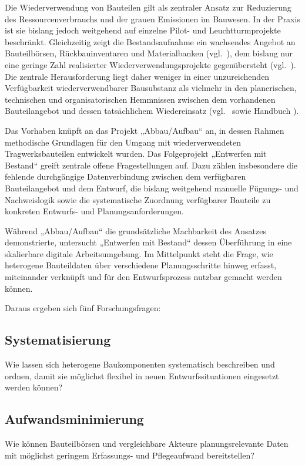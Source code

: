 \documentclass[type=zwischenbericht,theme=dark]{zukunftbau}
\begin{document}
Die Wiederverwendung von Bauteilen gilt als zentraler Ansatz zur Reduzierung des Ressourcenverbrauchs und der grauen Emissionen im Bauwesen. In der Praxis ist sie bislang jedoch weitgehend auf einzelne Pilot- und Leuchtturmprojekte beschränkt. Gleichzeitig zeigt die Bestandsaufnahme ein wachsendes Angebot an Bauteilbörsen, Rückbauinventaren und Materialbanken (vgl.\ ), dem bislang nur eine geringe Zahl realisierter Wiederverwendungsprojekte gegenübersteht (vgl.\ ). Die zentrale Herausforderung liegt daher weniger in einer unzureichenden Verfügbarkeit wiederverwendbarer Bausubstanz als vielmehr in den planerischen, technischen und organisatorischen Hemmnissen zwischen dem vorhandenen Bauteilangebot und dessen tatsächlichem Wiedereinsatz (vgl.\  sowie Handbuch \cite{udk-abbau-aufbau-handbuch-2023}).

Das Vorhaben knüpft an das Projekt „Abbau/Aufbau“ \cite{bbsr-abbau-aufbau-2024} an, in dessen Rahmen methodische Grundlagen für den Umgang mit wiederverwendeten Tragwerksbauteilen entwickelt wurden. Das Folgeprojekt „Entwerfen mit Bestand“ greift zentrale offene Fragestellungen auf. Dazu zählen insbesondere die fehlende durchgängige Datenverbindung zwischen dem verfügbaren Bauteilangebot und dem Entwurf, die bislang weitgehend manuelle Fügungs- und Nachweislogik sowie die systematische Zuordnung verfügbarer Bauteile zu konkreten Entwurfs- und Planungsanforderungen.

Während „Abbau/Aufbau“ die grundsätzliche Machbarkeit des Ansatzes demonstrierte, untersucht „Entwerfen mit Bestand“ dessen Überführung in eine skalierbare digitale Arbeitsumgebung. Im Mittelpunkt steht die Frage, wie heterogene Bauteildaten über verschiedene Planungsschritte hinweg erfasst, miteinander verknüpft und für den Entwurfsprozess nutzbar gemacht werden können.

Daraus ergeben sich fünf Forschungsfragen:

\subsection{Systematisierung}
Wie lassen sich heterogene Baukomponenten systematisch beschreiben und ordnen, damit sie möglichst flexibel in neuen Entwurfssituationen eingesetzt werden können?

\subsection{Aufwandsminimierung}
Wie können Bauteilbörsen und vergleichbare Akteure planungsrelevante Daten mit möglichst geringem Erfassungs- und Pflegeaufwand bereitstellen?
\end{document}
